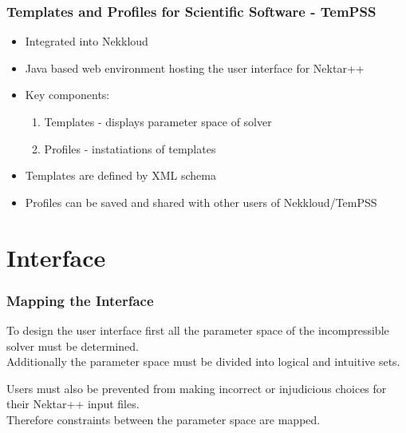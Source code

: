 \documentclass{beamer}
\begin{document}
\begin{frame}\frametitle{\textbf{Tem}plates and \textbf{P}rofiles for \textbf{S}cientific \textbf{S}oftware - \textbf{TemPSS}}
 
\begin{itemize}
\item Integrated into Nekkloud
\item Java based web environment hosting the user interface for Nektar++
\item Key components:  \begin{enumerate}\vspace{.25cm} \item Templates - displays parameter space of solver \item Profiles - instatiations of templates\end{enumerate}\vspace{.25cm}
\item Templates are defined by XML schema
\item Profiles can be saved and shared with other users of Nekkloud/TemPSS
\end{itemize}
\vspace{.5cm}
\centering\textbf{ \href{http://localhost:8080/tempss/profiles/}{}}
\end{frame}

\section{Interface}
\begin{frame}\frametitle{Mapping the Interface} 
To design the user interface first all the parameter space of the incompressible solver must be determined.\\
\vspace{.25cm}
Additionally the parameter space must be divided into logical and intuitive sets.\\
\begin{center}
\href{http://localhost:8081/IncNavierCollapse.html}{}
\end{center}
Users must also be prevented from making incorrect or injudicious choices for their Nektar++ input files.\\
\vspace{.25cm}
Therefore constraints between the parameter space are mapped.\\
\begin{center}
\href{http://localhost:8081/nek_dep.html}{}
\end{center}
\end{frame}
\end{document}
